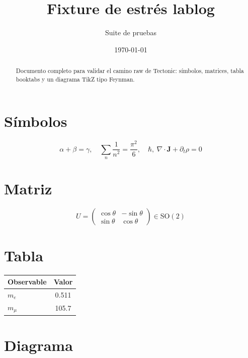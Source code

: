 \documentclass[11pt,a4paper]{article}
\title{Fixture de estrés lablog}
\author{Suite de pruebas}
\date{\today}
\begin{document}
\maketitle

\begin{abstract}
Documento completo para validar el camino raw de Tectonic: símbolos,
matrices, tabla booktabs y un diagrama TikZ tipo Feynman.
\end{abstract}

\section{Símbolos}
\[
\alpha+\beta=\gamma,\quad
\sum_n \frac{1}{n^2}=\frac{\pi^2}{6},\quad
\hbar,\ \nabla\cdot\mathbf{J}+\partial_t\rho=0
\]

\section{Matriz}
\[
U = \begin{pmatrix}
\cos\theta & -\sin\theta \\
\sin\theta & \cos\theta
\end{pmatrix}
\in \mathrm{SO}(2)
\]

\section{Tabla}
\begin{center}
\begin{tabular}{l S}
\toprule
{Observable} & {Valor} \\
\midrule
$m_e$ & 0.511 \\
$m_\mu$ & 105.7 \\
\bottomrule
\end{tabular}
\end{center}

\section{Diagrama}
\begin{center}
\end{center}
\end{document}
